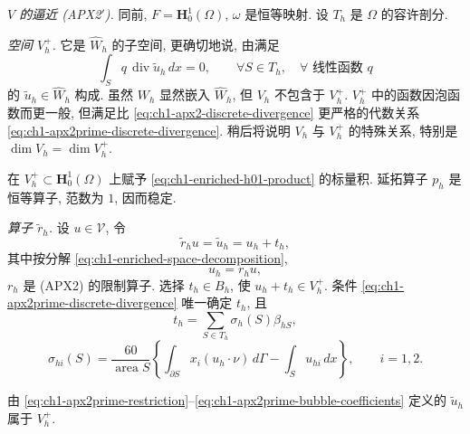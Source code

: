 \emph{$V$ 的逼近 (APX2$'$).} 同前, $F=\mathbf H_0^1(\Omega)$, $\omega$ 是恒等映射. 设 $T_h$ 是 $\Omega$ 的容许剖分.

\emph{空间 $V_h^+$.} 它是 $\widehat W_h$ 的子空间, 更确切地说, 由满足
\begin{equation}
\int_Sq\,\operatorname{div}\widetilde u_h\,dx=0,
\qquad\forall S\in T_h,\quad\forall\text{ 线性函数 }q
\label{eq:ch1-apx2prime-discrete-divergence}
\end{equation}
的 $\widetilde u_h\in\widehat W_h$ 构成. 虽然 $W_h$ 显然嵌入 $\widehat W_h$, 但 $V_h$ 不包含于 $V_h^+$. $V_h^+$ 中的函数因泡函数而更一般, 但满足比 \eqref{eq:ch1-apx2-discrete-divergence} 更严格的代数关系 \eqref{eq:ch1-apx2prime-discrete-divergence}. 稍后将说明 $V_h$ 与 $V_h^+$ 的特殊关系, 特别是 $\dim V_h=\dim V_h^+$.

在 $V_h^+\subset\mathbf H_0^1(\Omega)$ 上赋予 \eqref{eq:ch1-enriched-h01-product} 的标量积. 延拓算子 $p_h$ 是恒等算子, 范数为 $1$, 因而稳定.

\emph{算子 $\widetilde r_h$.} 设 $u\in\mathcal V$, 令
\begin{equation}
\widetilde r_hu=\widetilde u_h=u_h+t_h,
\label{eq:ch1-apx2prime-restriction}
\end{equation}
其中按分解 \eqref{eq:ch1-enriched-space-decomposition},
\begin{equation}
u_h=r_hu,
\label{eq:ch1-apx2prime-primary-part}
\end{equation}
$r_h$ 是 (APX2) 的限制算子. 选择 $t_h\in B_h$, 使 $u_h+t_h\in V_h^+$. 条件 \eqref{eq:ch1-apx2prime-discrete-divergence} 唯一确定 $t_h$, 且
\begin{equation}
t_h=\sum_{S\in T_h}\sigma_h(S)\beta_{hS},
\label{eq:ch1-apx2prime-bubble-corrector}
\end{equation}
\begin{equation}
\sigma_{hi}(S)
=\frac{60}{\operatorname{area}S}
\left\{\int_{\partial S}x_i(u_h\cdot\nu)\,d\Gamma
-\int_Su_{hi}\,dx\right\},
\qquad i=1,2.
\label{eq:ch1-apx2prime-bubble-coefficients}
\end{equation}

\begin{Lemma}
\label{lem:ch1-apx2prime-restriction-in-vhplus}
由 \eqref{eq:ch1-apx2prime-restriction}--\eqref{eq:ch1-apx2prime-bubble-coefficients} 定义的 $\widetilde u_h$ 属于 $V_h^+$.
\end{Lemma}

